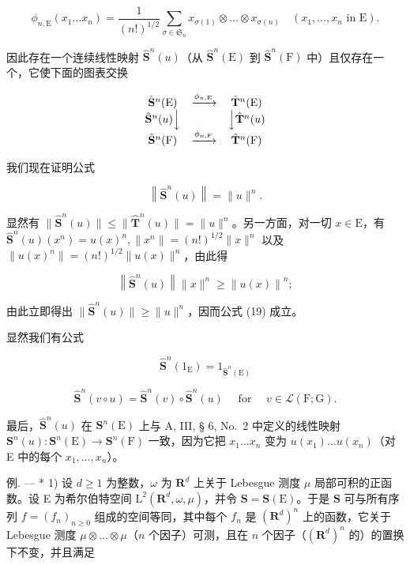 \[
\phi_ {n, \mathrm{E}} (x _ {1} \dots x _ {n}) = \frac {1}{(n !) ^ {1 / 2}} \sum_ {\sigma \in \mathfrak {S} _ {n}} x _ {\sigma (1)} \otimes \dots \otimes x _ {\sigma (n)} \quad (x _ {1},..., x _ {n} \text { in } \mathrm{E}).\tag{18}
\]

因此存在一个连续线性映射 \(\hat{\mathbf{S}}^{n}(u)\)（从 \(\hat{\mathbf{S}}^{n}(\mathrm{E})\) 到 \(\hat{\mathbf{S}}^{n}(\mathrm{F})\) 中）且仅存在一个，它使下面的图表交换

\[
\begin{array}{c c c} \hat {\mathbf {S}} ^ {n} (\mathrm{E}) & \xrightarrow {\phi_ {n , \mathrm{E}}} & \hat {\mathbf {T}} ^ {n} (\mathrm{E}) \\ \hat {\mathbf {S}} ^ {n} (u) \Big \downarrow & & \Big \downarrow \hat {\mathbf {T}} ^ {n} (u) \\ \hat {\mathbf {S}} ^ {n} (\mathrm{F}) & \xrightarrow {\phi_ {n , \mathrm{F}}} & \hat {\mathbf {T}} ^ {n} (\mathrm{F}) \end{array}
\]

我们现在证明公式

\[
\left\| \hat {\mathbf {S}} ^ {n} (u) \right\| = \| u \| ^ {n}.\tag{19}
\]

显然有 \(\| \hat{\mathbf{S}}^n (u)\| \leqslant \| \hat{\mathbf{T}}^n (u)\| = \| u\| ^n\)。另一方面，对一切 \(x\in \mathrm{E}\)，有 \(\hat{\mathbf{S}}^n (u)(x^n) = u(x)^n,\| x^n\| = (n!)^{1 / 2}\| x\| ^n\) 以及 \(\| u(x)^n\| = (n!)^{1 / 2}\| u(x)\| ^n\)，由此得

\[
\left\| \hat {\mathbf {S}} ^ {n} (u) \right\| \| x \| ^ {n} \geqslant \left\| u (x) \right\| ^ {n};
\]

由此立即得出 \(\| \hat{\mathbf{S}}^n (u)\| \geqslant \| u\| ^n\)，因而公式 (19) 成立。

显然我们有公式

\[
\hat {\mathbf {S}} ^ {n} (1 _ {\mathrm{E}}) = 1 _ {\hat {\mathbf {S}} ^ {n} (\mathrm{E})}\tag{20}
\]

\[
\hat {\mathbf {S}} ^ {n} (v \circ u) = \hat {\mathbf {S}} ^ {n} (v) \circ \hat {\mathbf {S}} ^ {n} (u) \quad \text { for } \quad v \in \mathscr {L} (\mathrm{F}; \mathrm{G}).\tag{21}
\]

最后，\(\hat{\mathbf{S}}^n (u)\) 在 \(\mathbf{S}^n (\mathrm{E})\) 上与 A, III, § 6, No.~2 中定义的线性映射 \(\mathbf{S}^n (u):\mathbf{S}^n (\mathrm{E})\to \mathbf{S}^n (\mathrm{F})\) 一致，因为它把 \(x_{1}\ldots x_{n}\) 变为 \(u(x_{1})\ldots u(x_{n})\)（对 E 中的每个 \(x_{1},\ldots ,x_{n}\)）。

例. --- * 1) 设 \(d \geqslant 1\) 为整数，\(\omega\) 为 \(\mathbf{R}^{d}\) 上关于 Lebesgue 测度 \(\mu\) 局部可积的正函数。设 E 为希尔伯特空间 \(\mathrm{L}^{2}(\mathbf{R}^{d}, \omega, \mu)\)，并令 \(\mathbf{S} = \mathbf{S}(\mathrm{E})\)。于是 \(\mathbf{S}\) 可与所有序列 \(f = (f_{n})_{n \geqslant 0}\) 组成的空间等同，其中每个 \(f_{n}\) 是 \((\mathbf{R}^{d})^{n}\) 上的函数，它关于 Lebesgue 测度 \(\mu \otimes \ldots \otimes \mu\)（\(n\) 个因子）可测，且在 \(n\) 个因子（\((\mathbf{R}^{d})^{n}\) 的）的置换下不变，并且满足

